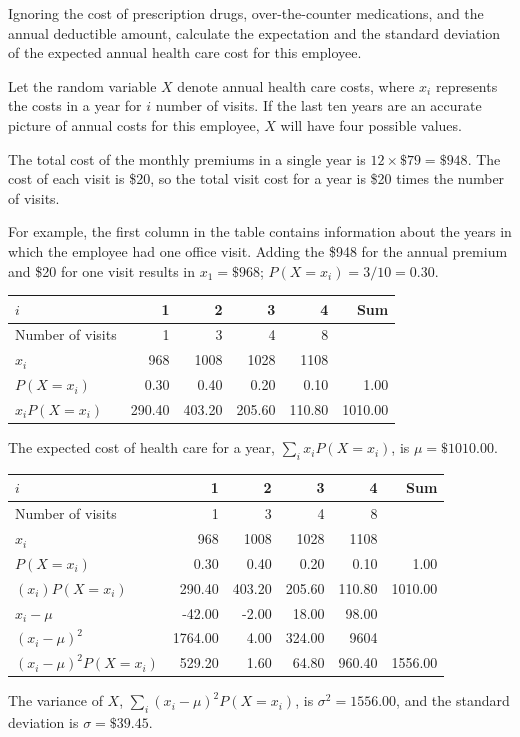 \begin{examplewrap}
\begin{nexample}{Ignoring the cost of prescription drugs, over-the-counter medications, and the annual deductible amount, calculate the expectation and the standard deviation of the expected annual health care cost for this employee.}  \label{example:healthCareCosts}
	
	Let the random variable $X$ denote annual health care costs, where $x_i$ represents the costs in a year for $i$ number of visits. If the last ten years are an accurate picture of annual costs for this employee, $X$ will have four possible values. 
	
	The total cost of the monthly premiums in a single year is $12 \times \$79 = \$948$. The cost of each visit is \$20, so the total visit cost for a year is \$20 times the number of visits. 
	
	For example, the first column in the table contains information about the years in which the employee had one office visit. Adding the \$948 for the annual premium and \$20 for one visit results in $x_{1}=\$968$; $P(X=x_{i}) = 3/10 = 0.30$.
	
	\begin{center}
		\begin{tabular}{l rrrr r}
			\hline
			$i$ & 1 & 2 & 3 & 4 & Sum \\
			\hline
			Number of visits & 1 & 3 & 4 & 8 &\\
			$x_i$ & 968 & 1008 & 1028 & 1108 &  \\
			$P(X=x_i)$ & 0.30 & 0.40 & 0.20 & 0.10 & 1.00 \\
			$x_i P(X=x_i)$ & 290.40 & 403.20 & 205.60 & 110.80 & 1010.00 \\
			\hline
		\end{tabular}
	\end{center}
	The expected cost of health care for a year, $\sum_i x_i P(X = x_i)$, is $\mu=\$1010.00$.
	\begin{center}
		\begin{tabular}{l rrrr r}
			\hline
			$i$ & 1 & 2 & 3 & 4 & Sum \\
			\hline
			Number of visits & 1 & 3 & 4 & 8 &\\
			$x_i$ & 968 & 1008 & 1028 & 1108 &  \\
			$P(X=x_i)$ & 0.30 & 0.40 & 0.20 & 0.10 & 1.00 \\
			$(x_i)P(X=x_i)$ & 290.40 & 403.20 & 205.60 & 110.80 & 1010.00 \\
			\hline
			$x_i - \mu$ & -42.00  & -2.00  & 18.00  & 98.00 & \\
			$(x_i - \mu)^2$ &  1764.00 & 4.00  & 324.00  & 9604 & \\
			$(x_i - \mu)^2 P(X=x_i)$ & 529.20  & 1.60  & 64.80  & 960.40 & 1556.00\\
			\hline
		\end{tabular}
	\end{center}
	The variance of $X$, $\sum_i (x_i - \mu)^2 P(X = x_i)$,  is $\sigma^2 = 1556.00$, and the standard deviation is $\sigma = \$39.45$.\footnotemark{}
\end{nexample}
\end{examplewrap}
